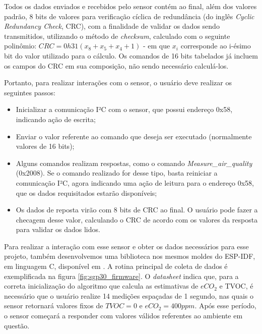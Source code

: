 \documentclass[../monografia.tex]{subfiles}
\begin{document}
Todos os dados enviados e recebidos pelo sensor contém ao final, além dos valores padrão, 8 bits de valores para verificação cíclica de redundância (do inglês \textit{Cyclic Redundancy Check}, CRC), com a finalidade de validar os dados sendo transmitidos, utilizando o método de \textit{checksum}, calculado com o seguinte polinômio: $CRC = 0h31 (x_{8} + x_{5} + x_{4} + 1)$ - em que $x_{i}$ corresponde ao i-ésimo bit do valor utilizado para o cálculo. Os comandos de 16 bits tabelados já incluem os campos do CRC em sua composição, não sendo necessário calculá-los.

Portanto, para realizar interações com o sensor, o usuário deve realizar os seguintes passos:

\begin{itemize}
	\item Inicializar a comunicação I²C com o sensor, que possui endereço 0x58, indicando ação de escrita;
	\item Enviar o valor referente ao comando que deseja ser executado (normalmente valores de 16 bits);
	\item Alguns comandos realizam respostas, como o comando \textit{Measure\_air\_quality} (0x2008). Se o comando realizado for desse tipo, basta reiniciar a comunicação I²C, agora indicando uma ação de leitura para o endereço 0x58, que os dados requisitados estarão disponíveis;
	\item Os dados de reposta virão com 8 bits de CRC ao final. O usuário pode fazer a checagem desse valor, calculando o CRC de acordo com os valores da resposta para validar os dados lidos.
\end{itemize}


Para realizar a interação com esse sensor e obter os dados necessários para esse projeto, também desenvolvemos uma biblioteca nos mesmos moldes do ESP-IDF, em linguagem C, disponível em \cite{sgp30-lib}. A rotina principal de coleta de dados é exemplificada na figura \ref{fig:sgp30_firmware}. O \textit{datasheet} indica que, para a correta inicialização do algoritmo que calcula as estimativas de $eCO_{2}$ e TVOC, é necessário que o usuário realize 14 medições espaçadas de 1 segundo, nas quais o sensor retornará valores fixos de $TVOC = 0$ e $eCO_{2} = 400 ppm$. Após esse período, o sensor começará a responder com valores válidos referentes ao ambiente em questão.
\end{document}
